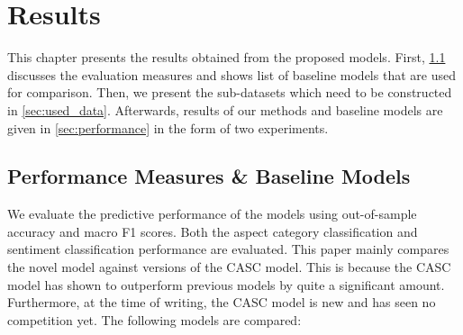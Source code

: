 \documentclass[american, oneside]{ecsgdp}
\begin{document}



\chapter{Results} \label{chap:results}
This chapter presents the results obtained from the proposed models. First, \cref{sec:baselines} discusses the evaluation measures and shows list of baseline models that are used for comparison. Then, we present the sub-datasets which need to be constructed in \cref{sec:used_data}. Afterwards, results of our methods and baseline models are given in \cref{sec:performance} in the form of two experiments.

\section{Performance Measures \& Baseline Models} \label{sec:baselines}
We evaluate the predictive performance of the models using out-of-sample accuracy and macro F1 scores. Both the aspect category classification and sentiment classification performance are evaluated. This paper mainly compares the novel model against versions of the CASC model. This is because the CASC model has shown to outperform previous models by quite a significant amount. Furthermore, at the time of writing, the CASC model is new and has seen no competition yet. The following models are compared:
\end{document}
